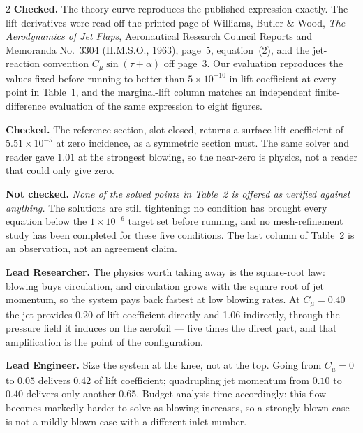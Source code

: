 \documentclass[8pt,a4paper]{extarticle}
\newcommand{\role}[1]{{\color{navy}\bfseries #1.}}
\begin{document}
\begin{multicols}{2}
\textbf{Checked.} The theory curve reproduces the published expression exactly.
The lift derivatives were read off the printed page of Williams, Butler \& Wood,
\emph{The Aerodynamics of Jet Flaps}, Aeronautical Research Council Reports and
Memoranda No.~3304 (H.M.S.O., 1963), page~5, equation~(2), and the jet-reaction
convention $C_\mu \sin(\tau + \alpha)$ off page~3. Our evaluation reproduces the
values fixed before running to better than $5 \times 10^{-10}$ in lift
coefficient at every point in Table~1, and the marginal-lift column matches an
independent finite-difference evaluation of the same expression to eight figures.

\textbf{Checked.} The reference section, slot closed, returns a surface lift
coefficient of $5.51 \times 10^{-5}$ at zero incidence, as a
symmetric section must. The same solver and reader gave $1.01$ at the strongest
blowing, so the near-zero is physics, not a reader that could only give zero.

\textbf{Not checked.} \emph{None of the solved points in Table~2 is offered as
verified against anything.} The solutions are still tightening: no condition has
brought every equation below the $1 \times 10^{-6}$ target set before running,
and no mesh-refinement study has been completed for these five conditions. The
last column of Table~2 is an observation, not an agreement claim.

\role{Lead Researcher} The physics worth taking away is the square-root law:
blowing buys circulation, and circulation grows with the square root of jet
momentum, so the system pays back fastest at low blowing rates. At
$C_\mu = 0.40$ the jet provides $0.20$ of lift coefficient directly and
1.06 indirectly, through the pressure field it induces on
the aerofoil --- five times the direct part, and that amplification is the
point of the configuration.

\role{Lead Engineer} Size the system at the knee, not at the top. Going from
$C_\mu = 0$ to $0.05$ delivers 0.42 of lift coefficient;
quadrupling jet momentum from $0.10$ to $0.40$ delivers only another
0.65. Budget analysis time accordingly:
this flow becomes markedly harder to solve as blowing increases, so a strongly
blown case is not a mildly blown case with a different inlet number.


\end{multicols}
\end{document}
